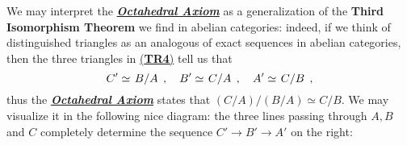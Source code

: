 \begin{rmk}
    We may interpret the \hyperref[TR4]{\emph{\textbf{Octahedral Axiom}}}
    as a generalization of the \textbf{Third Isomorphism Theorem} we
    find in abelian categories: indeed, if we think of distinguished
    triangles as an analogous of exact sequences in abelian categories, 
    then the three triangles in \hyperref[TR4]{(\textbf{TR4})} 
    tell us that
    \begin{equation*}
        C' \simeq \left. B \middle/ A \right. \,, \quad
        B' \simeq \left. C \middle/ A \right. \,, \quad
        A' \simeq \left. C \middle/ B \right. \,, 
    \end{equation*}
    thus the \hyperref[TR4]{\emph{\textbf{Octahedral Axiom}}}
    states that $(C/A)/(B/A) \simeq C/B$.
    We may visualize it in the following nice diagram:
    the three lines passing through $A,B$ and $C$ completely
    determine the sequence $C' \to B' \to A'$ on the right:
    \begin{center}
    \end{center}
\end{rmk}

